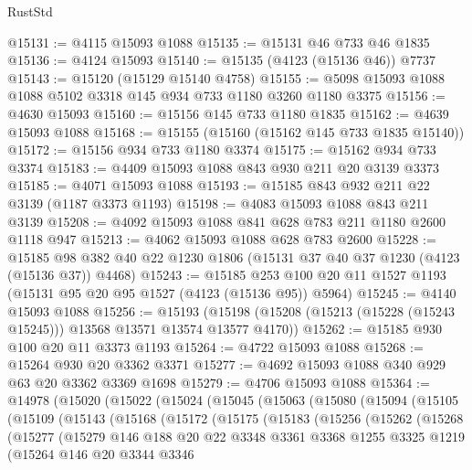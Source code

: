 \begin{lexlean}{RustStd}
\begin{coremodule}
@15131 := @4115 @15093 @1088
@15135 := @15131 @46 @733 @46 @1835
@15136 := @4124 @15093
@15140 := @15135 (@4123 (@15136 @46)) @7737
@15143 := @15120 (@15129 @15140 @4758)
@15155 := @5098 @15093 @1088 @1088 @5102 @3318 @145 @934 @733 @1180 @3260 @1180 @3375
@15156 := @4630 @15093
@15160 := @15156 @145 @733 @1180 @1835
@15162 := @4639 @15093 @1088
@15168 := @15155 (@15160 (@15162 @145 @733 @1835 @15140))
@15172 := @15156 @934 @733 @1180 @3374
@15175 := @15162 @934 @733 @3374
@15183 := @4409 @15093 @1088 @843 @930 @211 @20 @3139 @3373
@15185 := @4071 @15093 @1088
@15193 := @15185 @843 @932 @211 @22 @3139 (@1187 @3373 @1193)
@15198 := @4083 @15093 @1088 @843 @211 @3139
@15208 := @4092 @15093 @1088 @841 @628 @783 @211 @1180 @2600 @1118 @947
@15213 := @4062 @15093 @1088 @628 @783 @2600
@15228 := @15185 @98 @382 @40 @22 @1230 @1806 (@15131 @37 @40 @37 @1230 (@4123 (@15136 @37)) @4468)
@15243 := @15185 @253 @100 @20 @11 @1527 @1193 (@15131 @95 @20 @95 @1527 (@4123 (@15136 @95)) @5964)
@15245 := @4140 @15093 @1088
@15256 := @15193
    (@15198 (@15208 (@15213 (@15228 (@15243 @15245))) @13568 @13571 @13574 @13577 @4170))
@15262 := @15185 @930 @100 @20 @11 @3373 @1193
@15264 := @4722 @15093 @1088
@15268 := @15264 @930 @20 @3362 @3371
@15277 := @4692 @15093 @1088 @340 @929 @63 @20 @3362 @3369 @1698
@15279 := @4706 @15093 @1088
@15364 := @14978
    (@15020
      (@15022
        (@15024
          (@15045
            (@15063
              (@15080
                (@15094
                  (@15105
                    (@15109
                      (@15143
                        (@15168
                          (@15172
                            (@15175
                              (@15183
                                (@15256
                                  (@15262
                                    (@15268
                                      (@15277
                                        (@15279
                                          @146
                                          @188
                                          @20
                                          @22
                                          @3348
                                          @3361
                                          @3368
                                          @1255
                                          @3325
                                          @1219
                                          (@15264
                                            @146
                                            @20
                                            @3344
                                            @3346

\end{coremodule}
\end{lexlean}
